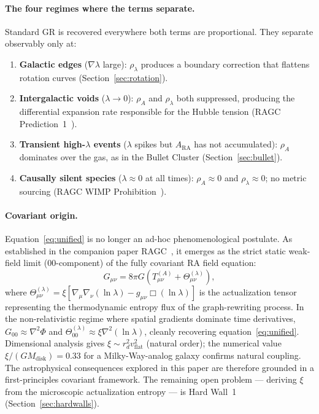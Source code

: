 \documentclass[11pt,a4paper]{article}
\theoremstyle{plain}
\theoremstyle{definition}
\theoremstyle{remark}
\newcommand{\ARA}{A_{\mathrm{RA}}}
\begin{document}
\paragraph{The four regimes where the terms separate.}
Standard GR is recovered everywhere both terms are proportional. They separate
observably only at:
\begin{enumerate}[noitemsep]
  \item \textbf{Galactic edges} ($\nabla\lambda$ large): $\rho_\lambda$ produces
  a boundary correction that flattens rotation curves (Section~\ref{sec:rotation}).
  \item \textbf{Intergalactic voids} ($\lambda \to 0$): $\rho_A$ and $\rho_\lambda$
  both suppressed, producing the differential expansion rate responsible for the
  Hubble tension (RAGC Prediction~1~\citep{Sandeman2026b}).
  \item \textbf{Transient high-$\lambda$ events} ($\lambda$ spikes but
  $\ARA$ has not accumulated): $\rho_A$ dominates over the gas, as in the
  Bullet Cluster (Section~\ref{sec:bullet}).
  \item \textbf{Causally silent species} ($\lambda \approx 0$ at all times):
  $\rho_A \approx 0$ and $\rho_\lambda \approx 0$; no metric sourcing
  (RAGC WIMP Prohibition~\citep{Sandeman2026b}).
\end{enumerate}

\paragraph{Covariant origin.}
Equation~\eqref{eq:unified} is no longer an ad-hoc phenomenological postulate.
As established in the companion paper RAGC~\citep{Sandeman2026b}, it emerges as
the strict static weak-field limit ($00$-component) of the fully covariant RA
field equation:
\begin{equation}
  G_{\mu\nu} = 8\pi G\!\left(T_{\mu\nu}^{(A)}
    + \Theta_{\mu\nu}^{(\lambda)}\right),
  \label{eq:covariant_field}
\end{equation}
where $\Theta_{\mu\nu}^{(\lambda)} = \xi[\nabla_\mu\nabla_\nu(\ln\lambda)
- g_{\mu\nu}\Box(\ln\lambda)]$ is the actualization tensor representing the
thermodynamic entropy flux of the graph-rewriting process. In the
non-relativistic regime where spatial gradients dominate time derivatives,
$G_{00} \approx \nabla^2\Phi$ and
$\Theta_{00}^{(\lambda)} \approx \xi\nabla^2(\ln\lambda)$, cleanly recovering
equation~\eqref{eq:unified}. Dimensional analysis gives
$\xi \sim r_d^2 v_{\mathrm{flat}}^2$ (natural order); the numerical value
$\xi/(G M_{\mathrm{disk}}) = 0.33$ for a Milky-Way-analog galaxy confirms
natural coupling. The astrophysical consequences explored in this paper are
therefore grounded in a first-principles covariant framework. The remaining
open problem --- deriving $\xi$ from the microscopic actualization entropy ---
is Hard Wall~1 (Section~\ref{sec:hardwalls}).
\end{document}

